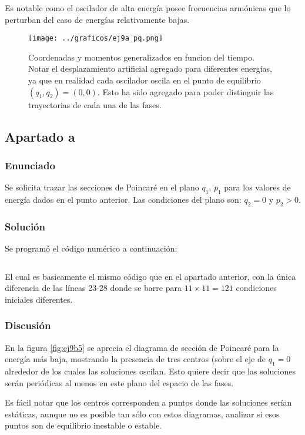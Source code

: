 \documentclass[a4paper,10pt]{paper}
\begin{document}
Es notable como el oscilador de alta energ\'{i}a posee frecuencias arm\'onicas que lo perturban del caso de energ\'{i}as
relativamente bajas.

\begin{figure}[!h]
 \centering
 \texttt{[image: ../graficos/ej9a\_pq.png]}
 \caption{Coordenadas y momentos generalizados en funcion del tiempo. 
 Notar el desplazamiento artificial agregado para diferentes energ\'{i}as, 
 ya que en realidad cada oscilador oscila en el punto de equilibrio $(q_1, q_2)= (0, 0)$. 
 Esto ha sido agregado para poder distinguir las trayectorias de cada una de las fases.}
 \label{fig:9pq}
\end{figure}

\subsection{Apartado a}
\subsubsection{Enunciado}
Se solicita trazar las secciones de Poincar\'e en el plano $q_1$, $p_1$ para los valores de energ\'{i}a dados en el punto 
anterior. Las condiciones del plano son: $q_2 = 0$ y $p_2 > 0$. 

\subsubsection{Soluci\'on}
Se program\'o el c\'odigo num\'erico a continuaci\'on:
\inputminted[firstline=16, linenos, firstnumber=1]{fortran}{../9/ej9b.f90}

El cual es basicamente el mismo c\'odigo que en el apartado anterior, con la \'unica diferencia de 
las l\'{i}neas 23-28 donde se barre para $11\times 11 = 121$ condiciones iniciales diferentes.

\subsubsection{Discusi\'on}
En la figura \ref{fig:ej9b5} se aprecia el diagrama de secci\'on de Poincar\'e para la energ\'{i}a m\'as baja, 
mostrando la presencia de tres centros (sobre el eje de $q_1 = 0$ alrededor de los cuales las soluciones oscilan.
Esto quiere decir que las soluciones ser\'an peri\'odicas al menos en este plano del espacio de las fases.

Es f\'acil notar que los centros corresponden a puntos donde las soluciones ser\'{i}an est\'aticas, aunque 
no es posible tan s\'olo con estos diagramas, analizar si esos puntos son de equilibrio inestable o estable.
\end{document}
